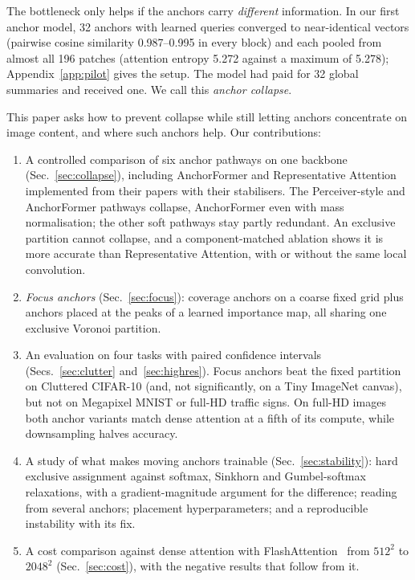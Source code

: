 \documentclass[10pt]{article}
\begin{document}
The bottleneck only helps if the anchors carry \emph{different} information. In our first anchor
model, 32 anchors with learned queries converged to near-identical vectors (pairwise cosine
similarity 0.987--0.995 in every block) and each pooled from almost all 196 patches (attention
entropy 5.272 against a maximum of 5.278); Appendix~\ref{app:pilot} gives the setup. The model
had paid for 32 global summaries and received one. We call this \emph{anchor collapse}.

This paper asks how to prevent collapse while still letting anchors concentrate on image
content, and where such anchors help. Our contributions:
\begin{enumerate}
\item A controlled comparison of six anchor pathways on one backbone (Sec.~\ref{sec:collapse}),
including AnchorFormer and Representative Attention implemented from their papers with their
stabilisers. The Perceiver-style and AnchorFormer pathways collapse, AnchorFormer even with mass
normalisation; the other soft pathways stay partly redundant. An exclusive partition cannot
collapse, and a component-matched
ablation shows it is more accurate than Representative Attention, with or without the same
local convolution.
\item \emph{Focus anchors} (Sec.~\ref{sec:focus}): coverage anchors on a coarse fixed grid plus
anchors placed at the peaks of a learned importance map, all sharing one exclusive Voronoi
partition.
\item An evaluation on four tasks with paired confidence intervals (Secs.~\ref{sec:clutter}
and~\ref{sec:highres}). Focus anchors beat the fixed partition on Cluttered CIFAR-10 (and, not
significantly, on a Tiny ImageNet canvas), but not on Megapixel MNIST or full-HD traffic signs.
On full-HD images both anchor variants match dense attention at a fifth of its compute, while
downsampling halves accuracy.
\item A study of what makes moving anchors trainable (Sec.~\ref{sec:stability}): hard
exclusive assignment against softmax, Sinkhorn and Gumbel-softmax relaxations, with a
gradient-magnitude argument for the difference; reading from several anchors; placement
hyperparameters; and a reproducible instability with its fix.
\item A cost comparison against dense attention with FlashAttention~\citep{dao2022flashattention}
from $512^2$ to $2048^2$ (Sec.~\ref{sec:cost}), with the negative results that follow from it.
\end{enumerate}
\end{document}
